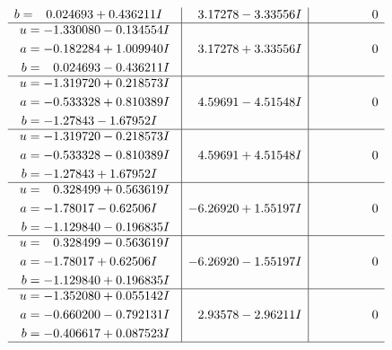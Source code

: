 \documentclass[1p]{elsarticle_modified}
\theoremstyle{definition}
\begin{document}
$$\begin{array}{c|c|c}
\begin{aligned}
b &= \phantom{-}0.024693 + 0.436211 I\end{aligned}
 & \phantom{-}3.17278 - 3.33556 I & \phantom{-0.000000 } 0 \\ \hline\begin{aligned}
u &= -1.330080 - 0.134554 I \\
a &= -0.182284 + 1.009940 I \\
b &= \phantom{-}0.024693 - 0.436211 I\end{aligned}
 & \phantom{-}3.17278 + 3.33556 I & \phantom{-0.000000 } 0 \\ \hline\begin{aligned}
u &= -1.319720 + 0.218573 I \\
a &= -0.533328 + 0.810389 I \\
b &= -1.27843 - 1.67952 I\end{aligned}
 & \phantom{-}4.59691 - 4.51548 I & \phantom{-0.000000 } 0 \\ \hline\begin{aligned}
u &= -1.319720 - 0.218573 I \\
a &= -0.533328 - 0.810389 I \\
b &= -1.27843 + 1.67952 I\end{aligned}
 & \phantom{-}4.59691 + 4.51548 I & \phantom{-0.000000 } 0 \\ \hline\begin{aligned}
u &= \phantom{-}0.328499 + 0.563619 I \\
a &= -1.78017 - 0.62506 I \\
b &= -1.129840 - 0.196835 I\end{aligned}
 & -6.26920 + 1.55197 I & \phantom{-0.000000 } 0 \\ \hline\begin{aligned}
u &= \phantom{-}0.328499 - 0.563619 I \\
a &= -1.78017 + 0.62506 I \\
b &= -1.129840 + 0.196835 I\end{aligned}
 & -6.26920 - 1.55197 I & \phantom{-0.000000 } 0 \\ \hline\begin{aligned}
u &= -1.352080 + 0.055142 I \\
a &= -0.660200 - 0.792131 I \\
b &= -0.406617 + 0.087523 I\end{aligned}
 & \phantom{-}2.93578 - 2.96211 I & \phantom{-0.000000 } 0\\
 \hline 
 \end{array}$$\newpage$$\begin{array}{c|c|c}  

\end{array}$$
\end{document}

